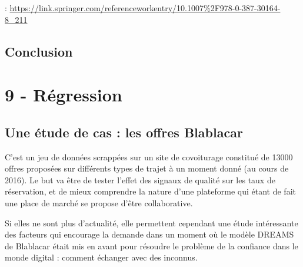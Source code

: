 \documentclass[
]{book}
\begin{document}
: \url{https://link.springer.com/referenceworkentry/10.1007\%2F978-0-387-30164-8_211}

\hypertarget{conclusion-1}{%
\section{Conclusion}\label{conclusion-1}}

\hypertarget{ruxe9gression}{%
\chapter{9 - Régression}\label{ruxe9gression}}

\hypertarget{une-uxe9tude-de-cas-les-offres-blablacar}{%
\section{Une étude de cas : les offres Blablacar}\label{une-uxe9tude-de-cas-les-offres-blablacar}}

C'est un jeu de données scrappées sur un site de covoiturage constitué de 13000 offres proposées sur différents types de trajet à un moment donné (au cours de 2016). Le but va être de tester l'effet des signaux de qualité sur les taux de réservation, et de mieux comprendre la nature d'une plateforme qui étant de fait une place de marché se propose d'être collaborative.

Si elles ne sont plus d'actualité, elle permettent cependant une étude intéressante des facteurs qui encourage la demande dans un moment où le modèle DREAMS de Blablacar était mis en avant pour résoudre le problème de la confiance dans le monde digital : comment échanger avec des inconnus.
\end{document}
